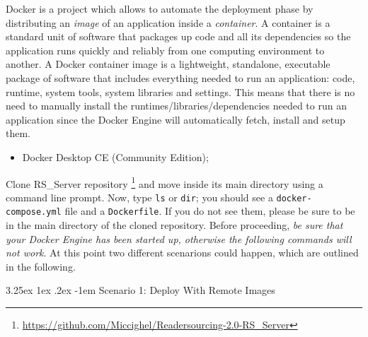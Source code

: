 \documentclass[a4paper, english]{article}
\makeatletter
\newcounter{subsubsubsection}[subsubsection]
\renewcommand\paragraph{\@startsection{paragraph}{5}{\z@}%
  {3.25ex \@plus1ex \@minus.2ex}%
  {-1em}%
  {\normalfont\normalsize\bfseries}}
\makeatother
\begin{document}
Docker is a project which allows to automate the deployment phase by distributing an \emph{image} of an application inside a \emph{container}. A container is a standard unit of software that packages up code and all its dependencies so the application runs quickly and reliably from one computing environment to another. A Docker container image is a lightweight, standalone, executable package of software that includes everything needed to run an application: code, runtime, system tools, system libraries and settings. This means that there is no need to manually install the runtimes/libraries/dependencies needed to run an application since the Docker Engine will automatically fetch, install and setup them.


\begin{itemize}
\item Docker Desktop CE (Community Edition);
\end{itemize}


Clone  RS\_Server repository \footnote{\url{https://github.com/Miccighel/Readersourcing-2.0-RS_Server}} and move inside its main directory using a command line prompt. Now, type \verb|ls| or \verb|dir|; you should see a \verb|docker-compose.yml| file and a \verb|Dockerfile|. If you do not see them, please be sure to be in the main directory of the cloned repository. Before proceeding, \emph{be sure that your Docker Engine has been started up, otherwise the following commands will not work}. At this point two different scenarions could happen, which are outlined in the following. 

\paragraph{Scenario 1: Deploy With Remote Images}
\end{document}
